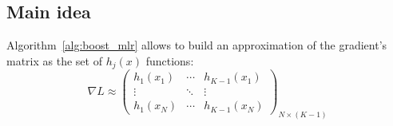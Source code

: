 \documentclass{article}
\begin{document}

\subsection{Main idea}
Algorithm~\ref{alg:boost_mlr} allows to build an approximation of the gradient's matrix as the set of $h_j(x)$ functions:
\[
	\nabla L \approx
	\begin{pmatrix}
		h_{1}(x_{1}) & \cdots & h_{K-1}(x_{1}) \\
			  \vdots & \ddots & \vdots \\
		h_{1}(x_{N}) & \cdots & h_{K-1}(x_{N})
	\end{pmatrix}_{N\times(K-1)}
\]
\end{document}
